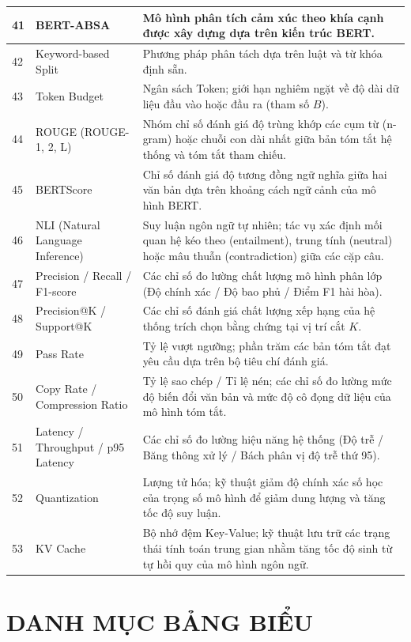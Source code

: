 \documentclass[12pt,a4paper]{report}
\begin{document}
\begin{longtable}{|p{}|p{}|p{}|}
41 & BERT-ABSA & Mô hình phân tích cảm xúc theo khía cạnh được xây dựng dựa trên kiến trúc BERT. \\ \hline
42 & Keyword-based Split & Phương pháp phân tách dựa trên luật và từ khóa định sẵn. \\ \hline
43 & Token Budget & Ngân sách Token; giới hạn nghiêm ngặt về độ dài dữ liệu đầu vào hoặc đầu ra (tham số $B$). \\ \hline
44 & ROUGE (ROUGE-1, 2, L) & Nhóm chỉ số đánh giá độ trùng khớp các cụm từ (n-gram) hoặc chuỗi con dài nhất giữa bản tóm tắt hệ thống và tóm tắt tham chiếu. \\ \hline
45 & BERTScore & Chỉ số đánh giá độ tương đồng ngữ nghĩa giữa hai văn bản dựa trên khoảng cách ngữ cảnh của mô hình BERT. \\ \hline
46 & NLI (Natural Language Inference) & Suy luận ngôn ngữ tự nhiên; tác vụ xác định mối quan hệ kéo theo (entailment), trung tính (neutral) hoặc mâu thuẫn (contradiction) giữa các cặp câu. \\ \hline
47 & Precision / Recall / F1-score & Các chỉ số đo lường chất lượng mô hình phân lớp (Độ chính xác / Độ bao phủ / Điểm F1 hài hòa). \\ \hline
48 & Precision@K / Support@K & Các chỉ số đánh giá chất lượng xếp hạng của hệ thống trích chọn bằng chứng tại vị trí cắt $K$. \\ \hline
49 & Pass Rate & Tỷ lệ vượt ngưỡng; phần trăm các bản tóm tắt đạt yêu cầu dựa trên bộ tiêu chí đánh giá. \\ \hline
50 & Copy Rate / Compression Ratio & Tỷ lệ sao chép / Tỉ lệ nén; các chỉ số đo lường mức độ biến đổi văn bản và mức độ cô đọng dữ liệu của mô hình tóm tắt. \\ \hline
51 & Latency / Throughput / p95 Latency & Các chỉ số đo lường hiệu năng hệ thống (Độ trễ / Băng thông xử lý / Bách phân vị độ trễ thứ 95). \\ \hline
52 & Quantization & Lượng tử hóa; kỹ thuật giảm độ chính xác số học của trọng số mô hình để giảm dung lượng và tăng tốc độ suy luận. \\ \hline
53 & KV Cache & Bộ nhớ đệm Key-Value; kỹ thuật lưu trữ các trạng thái tính toán trung gian nhằm tăng tốc độ sinh từ tự hồi quy của mô hình ngôn ngữ. \\ \hline
\end{longtable}
\renewcommand{\arraystretch}{1.0}

\chapter*{DANH MỤC BẢNG BIỂU}
{}
\end{document}

